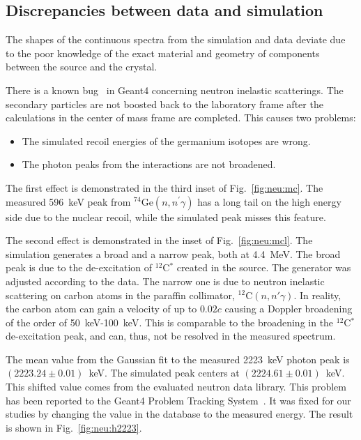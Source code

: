 \subsection{Discrepancies between data and simulation}
\label{sec:neu:dine}
The shapes of the continuous spectra from the simulation and data
deviate due to the poor knowledge of the exact material and geometry
of components between the source and the crystal.

There is a known bug~\cite{g4bug1} in Geant4 concerning neutron
inelastic scatterings. The secondary particles are not boosted back to
the laboratory frame after the calculations in the center of mass
frame are completed. This causes two problems:
\begin{itemize}
\item The simulated recoil energies of the germanium isotopes are
  wrong.
\item The photon peaks from the interactions are not broadened.
\end{itemize}

The first effect is demonstrated in the third inset of
Fig.~\ref{fig:neu:mc}. The measured 596~keV peak from
$^{74}$Ge$(n,n^\prime\gamma)$ has a long tail on the high energy side
due to the nuclear recoil, while the simulated peak misses this
feature.

The second effect is demonstrated in the inset of Fig.~\ref{fig:neu:mcl}.  The simulation generates a broad and a narrow peak, both at 4.4~MeV.  The broad peak is due to the de-excitation of $^{12}$C$^{*}$ created in the source. The generator was adjusted according to the data. The narrow one is due to neutron inelastic scattering on carbon atoms in the paraffin collimator, $^{12}$C$(n,n'\gamma)$. In reality, the carbon atom can gain a velocity of up to $0.02c$ causing a Doppler broadening of the order of 50~keV-100~keV. This is comparable to the broadening in the $^{12}$C$^{*}$ de-excitation peak, and can, thus, not be resolved in the measured spectrum.

The mean value from the Gaussian fit to the measured 2223~keV photon
peak is $(2223.24 \pm 0.01)$~keV. The simulated peak centers at
$(2224.61 \pm 0.01)$~keV. This shifted value comes from the evaluated
neutron data library. This problem has been reported to the Geant4
Problem Tracking System~\cite{g4bug2}. It was fixed for our studies by
changing the value in the database to the measured energy. The result
is shown in Fig.~\ref{fig:neu:h2223}.

